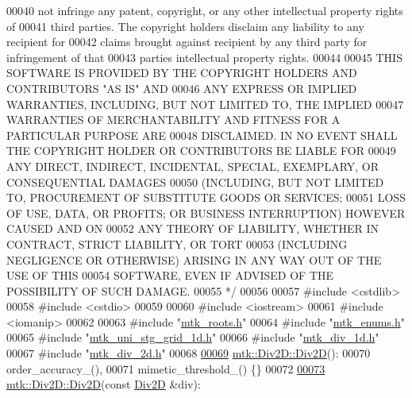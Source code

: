 \begin{DoxyCode}
00040 \textcolor{comment}{not infringe any patent, copyright, or any other intellectual property rights of}
00041 \textcolor{comment}{third parties. The copyright holders disclaim any liability to any recipient for}
00042 \textcolor{comment}{claims brought against recipient by any third party for infringement of that}
00043 \textcolor{comment}{parties intellectual property rights.}
00044 \textcolor{comment}{}
00045 \textcolor{comment}{THIS SOFTWARE IS PROVIDED BY THE COPYRIGHT HOLDERS AND CONTRIBUTORS "AS IS" AND}
00046 \textcolor{comment}{ANY EXPRESS OR IMPLIED WARRANTIES, INCLUDING, BUT NOT LIMITED TO, THE IMPLIED}
00047 \textcolor{comment}{WARRANTIES OF MERCHANTABILITY AND FITNESS FOR A PARTICULAR PURPOSE ARE}
00048 \textcolor{comment}{DISCLAIMED. IN NO EVENT SHALL THE COPYRIGHT HOLDER OR CONTRIBUTORS BE LIABLE FOR}
00049 \textcolor{comment}{ANY DIRECT, INDIRECT, INCIDENTAL, SPECIAL, EXEMPLARY, OR CONSEQUENTIAL DAMAGES}
00050 \textcolor{comment}{(INCLUDING, BUT NOT LIMITED TO, PROCUREMENT OF SUBSTITUTE GOODS OR SERVICES;}
00051 \textcolor{comment}{LOSS OF USE, DATA, OR PROFITS; OR BUSINESS INTERRUPTION) HOWEVER CAUSED AND ON}
00052 \textcolor{comment}{ANY THEORY OF LIABILITY, WHETHER IN CONTRACT, STRICT LIABILITY, OR TORT}
00053 \textcolor{comment}{(INCLUDING NEGLIGENCE OR OTHERWISE) ARISING IN ANY WAY OUT OF THE USE OF THIS}
00054 \textcolor{comment}{SOFTWARE, EVEN IF ADVISED OF THE POSSIBILITY OF SUCH DAMAGE.}
00055 \textcolor{comment}{*/}
00056 
00057 \textcolor{preprocessor}{#include <cstdlib>}
00058 \textcolor{preprocessor}{#include <cstdio>}
00059 
00060 \textcolor{preprocessor}{#include <iostream>}
00061 \textcolor{preprocessor}{#include <iomanip>}
00062 
00063 \textcolor{preprocessor}{#include "\hyperlink{mtk__roots_8h}{mtk\_roots.h}"}
00064 \textcolor{preprocessor}{#include "\hyperlink{mtk__enums_8h}{mtk\_enums.h}"}
00065 \textcolor{preprocessor}{#include "\hyperlink{mtk__uni__stg__grid__1d_8h}{mtk\_uni\_stg\_grid\_1d.h}"}
00066 \textcolor{preprocessor}{#include "\hyperlink{mtk__div__1d_8h}{mtk\_div\_1d.h}"}
00067 \textcolor{preprocessor}{#include "\hyperlink{mtk__div__2d_8h}{mtk\_div\_2d.h}"}
00068 
\hypertarget{mtk__div__2d_8cc_source_l00069}{}\hyperlink{classmtk_1_1Div2D_a124b888d5889538977e1a47d2fec78ff}{00069} \hyperlink{classmtk_1_1Div2D_a124b888d5889538977e1a47d2fec78ff}{mtk::Div2D::Div2D}():
00070   order\_accuracy\_(),
00071   mimetic\_threshold\_() \{\}
00072 
\hypertarget{mtk__div__2d_8cc_source_l00073}{}\hyperlink{classmtk_1_1Div2D_a0f5214b5099f17940d6643f39c53332e}{00073} \hyperlink{classmtk_1_1Div2D_a124b888d5889538977e1a47d2fec78ff}{mtk::Div2D::Div2D}(\textcolor{keyword}{const} \hyperlink{classmtk_1_1Div2D}{Div2D} &div):

\end{DoxyCode}
